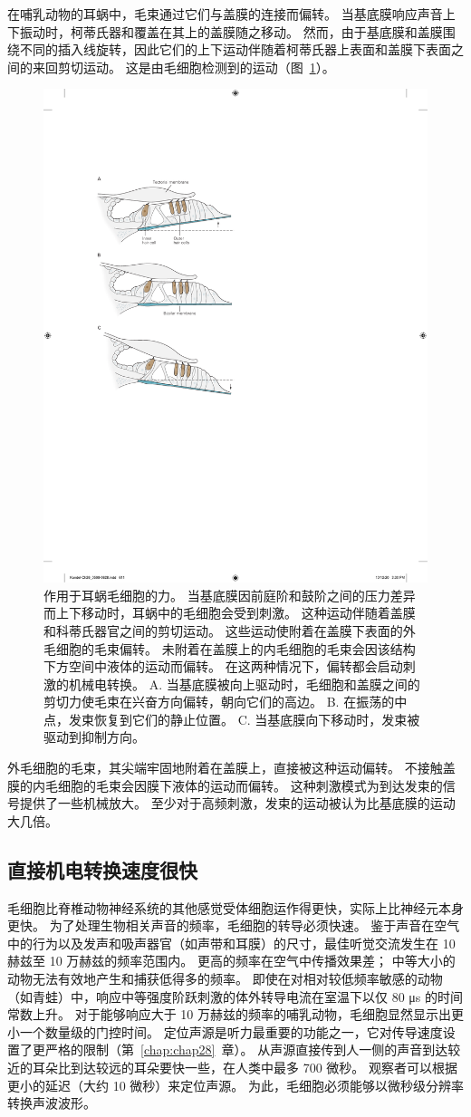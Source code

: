 在哺乳动物的耳蜗中，毛束通过它们与盖膜的连接而偏转。
当基底膜响应声音上下振动时，柯蒂氏器和覆盖在其上的盖膜随之移动。
然而，由于基底膜和盖膜围绕不同的插入线旋转，因此它们的上下运动伴随着柯蒂氏器上表面和盖膜下表面之间的来回剪切运动。
这是由毛细胞检测到的运动（图~\ref{fig:26_9}）。


\begin{figure}[htbp]
	\centering
	\includegraphics[width=0.5\linewidth]{chap26/fig_26_9}
	\caption{作用于耳蜗毛细胞的力。
		当基底膜因前庭阶和鼓阶之间的压力差异而上下移动时，耳蜗中的毛细胞会受到刺激。
		这种运动伴随着盖膜和科蒂氏器官之间的剪切运动。 
		这些运动使附着在盖膜下表面的外毛细胞的毛束偏转。
		未附着在盖膜上的内毛细胞的毛束会因该结构下方空间中液体的运动而偏转。
		在这两种情况下，偏转都会启动刺激的机械电转换。
		A. 当基底膜被向上驱动时，毛细胞和盖膜之间的剪切力使毛束在兴奋方向偏转，朝向它们的高边。
		B. 在振荡的中点，发束恢复到它们的静止位置。
		C. 当基底膜向下移动时，发束被驱动到抑制方向。}
	\label{fig:26_9}
\end{figure}


外毛细胞的毛束，其尖端牢固地附着在盖膜上，直接被这种运动偏转。
不接触盖膜的内毛细胞的毛束会因膜下液体的运动而偏转。
这种刺激模式为到达发束的信号提供了一些机械放大。
至少对于高频刺激，发束的运动被认为比基底膜的运动大几倍。



\subsection{直接机电转换速度很快}

毛细胞比脊椎动物神经系统的其他感觉受体细胞运作得更快，实际上比神经元本身更快。
为了处理生物相关声音的频率，毛细胞的转导必须快速。 
鉴于声音在空气中的行为以及发声和吸声器官（如声带和耳膜）的尺寸，最佳听觉交流发生在 10 赫兹至 10 万赫兹的频率范围内。
更高的频率在空气中传播效果差；
中等大小的动物无法有效地产生和捕获低得多的频率。
即使在对相对较低频率敏感的动物（如青蛙）中，响应中等强度阶跃刺激的体外转导电流在室温下以仅 80 μs 的时间常数上升。
对于能够响应大于 10 万赫兹的频率的哺乳动物，毛细胞显然显示出更小一个数量级的门控时间。
定位声源是听力最重要的功能之一，它对传导速度设置了更严格的限制（第~\ref{chap:chap28}~章）。
从声源直接传到人一侧的声音到达较近的耳朵比到达较远的耳朵要快一些，在人类中最多 700 微秒。
观察者可以根据更小的延迟（大约 10 微秒）来定位声源。
为此，毛细胞必须能够以微秒级分辨率转换声波波形。



